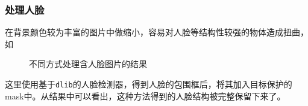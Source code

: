 \documentclass[twoside,a4paper,4pt]{article}
\begin{document}
\subsubsection{处理人脸}
在背景颜色较为丰富的图片中做缩小，容易对人脸等结构性较强的物体造成扭曲，如
\begin{figure}[H]
    \centering
    \caption{不同方式处理含人脸图片的结果}
    \label{fig:face_prot}
\end{figure}\par
这里使用基于\texttt{dlib}的人脸检测器，得到人脸的包围框后，将其加入目标保护的mask中。从结果中可以看出，这种方法得到的人脸结构被完整保留下来了。
\end{document}
